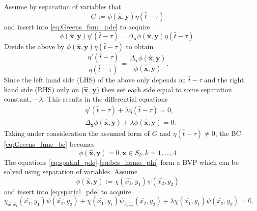 \documentclass[\main/thesis.tex]{subfiles}
\begin{document}
Assume by separation of variables that 
\begin{equation*}
	G {:=} \phi(\boldsymbol{\hat{x}}, \boldsymbol{y}) \eta(\hat{t}{-}\tau)
\end{equation*}
and insert into \eqref{eq:Greens_func_pde} to acquire
\begin{equation*}
	\phi(\boldsymbol{\hat{x}}, \boldsymbol{y}) \eta'(\hat{t}{-}\tau) {=} \Delta_{\boldsymbol{\hat{x}}} \phi(\boldsymbol{\hat{x}}, \boldsymbol{y}) \eta(\hat{t}{-}\tau).
\end{equation*}
Divide the above by $\phi(\boldsymbol{\hat{x}}, \boldsymbol{y}) \eta(\hat{t}{-}\tau)$ to obtain
\begin{equation*}
	    \frac{\eta'(\hat{t}{-}\tau)}
	         {\eta(\hat{t}{-}\tau)}
	{=} \frac{\Delta_{\boldsymbol{\hat{x}}} \phi(\boldsymbol{\hat{x}}, \boldsymbol{y})}
	         {\phi(\boldsymbol{\hat{x}}, \boldsymbol{y})}.
\end{equation*}
Since the left hand side (LHS) of the above only depends on $\hat{t}{-}\tau$ and the right 
hand side (RHS) only on ($\boldsymbol{\hat{x}}$, $\boldsymbol{y}$) then set each side equal to some separation 
constant, $\minus \lambda$.
This results in the differential equations
\begin{align}
	&\eta'(\hat{t}{-}\tau) {+} \lambda \eta(\hat{t}{-}\tau) {=} 0,
	 \label{eq:time_ode} \\
	&\Delta_{\boldsymbol{\hat{x}}} \phi(\boldsymbol{\hat{x}}, \boldsymbol{y}) {+} \lambda \phi(\boldsymbol{\hat{x}}, \boldsymbol{y}) {=} 0.
	 \label{eq:spatial_pde}
\end{align}
Taking under consideration the assumed form of $G$ and
$\eta(\hat{t}{-}\tau) {\ne} 0$, the BC \eqref{eq:Greens_func_bc} becomes
\begin{equation}
	\phi(\boldsymbol{\hat{x}}, \boldsymbol{y}) {=} 0, \boldsymbol{\hat{x}} {\in} S_k, k {=} 1, ..., 4
	\label{eq:bcs_homo_phi}
\end{equation}
The equations \eqref{eq:spatial_pde}-\eqref{eq:bcs_homo_phi} form a BVP which 
can be solved using separation of variables. Assume
\begin{equation*}
	\phi(\boldsymbol{\hat{x}}, \boldsymbol{y}) {:=} \chi(\hat{x_1}, y_1) \psi(\hat{x_2}, y_2)
\end{equation*}
and insert into
\eqref{eq:spatial_pde} to acquire
\begin{equation*}
	\chi_{\hat{x_1}\hat{x_1}}(\hat{x_1}, y_1) \psi(\hat{x_2}, y_2) {+} \chi(\hat{x_1}, y_1) \psi_{\hat{x_2}\hat{x_2}}(\hat{x_2}, y_2)
	{+} \lambda \chi(\hat{x_1}, y_1) \psi(\hat{x_2}, y_2) {=} 0.
\end{equation*} 
\end{document}
